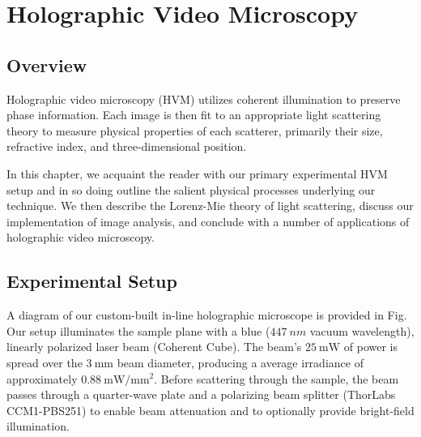 \chapter{Holographic Video Microscopy}
\label{ch:hvm}


\newcommand{\einc}{\vec{E}_{\text{inc}}}
\newcommand{\escat}{\vec{E}_{\text{s}}}
\newcommand{\eadd}{\vec{E}_{\text{add}}}
\def\Plus{\texttt{+}}

\section{Overview}



Holographic video microscopy (HVM) utilizes coherent
illumination to preserve phase information.
Each image is then fit to an appropriate light scattering
theory to measure physical properties of each scatterer, primarily
their size, refractive index, and three-dimensional position.

In this chapter, we acquaint the reader with our primary experimental
HVM setup and in so doing outline the salient physical processes underlying
our technique. We then describe the Lorenz-Mie theory of light
scattering, %
discuss our implementation of image analysis, and 
conclude with a number of applications of holographic video
microscopy.


\section{Experimental Setup}
\label{ch:hvm:sec:hvm}

A diagram of our custom-built in-line holographic microscope
is provided in Fig.~%
Our setup illuminates
the sample plane with a blue ($\SI{447}{nm}$ vacuum wavelength),
linearly polarized laser beam (Coherent Cube). The beam's
$\SI{25}{\mW}$ of power is spread over the $\SI{3}{\mm}$ beam
diameter, producing a average irradiance of approximately
$\SI{0.88}{\mW / \mm^2}$. Before scattering through the
sample, the beam passes through a quarter-wave plate and a
polarizing beam splitter (ThorLabs CCM1-PBS251) to enable
beam attenuation and to optionally provide bright-field
illumination.

